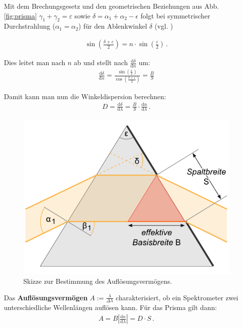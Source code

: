 \documentclass[12pt,a4paper,titlepage,headinclude,bibtotoc]{scrartcl}
\newcommand{\dif}{\ensuremath{\mathrm{d}}}
\begin{document}
Mit dem Brechungsgesetz  und den geometrischen Beziehungen aus Abb.\ref{fig:prisma} $\gamma_1+\gamma_2=\varepsilon$ sowie $\delta=\alpha_1+\alpha_2-\epsilon$ folgt bei symmetrischer Durchstrahlung ($\alpha_1=\alpha_2$) für den Ablenkwinkel $\delta$ (vgl. \cite[S.187f.]{hecht})

\begin{align}
	\sin\left(\frac{\delta+\varepsilon}{2}\right)=n\cdot\sin\left(\frac{\varepsilon}{2}\right)\,.
\end{align}

Dies leitet man nach $n$ ab und stellt nach $\frac{\dif \delta}{\dif n}$ um:
\begin{align}
	\frac{\dif \delta}{\dif n}=\frac{\sin\left(\frac{\varepsilon}{2}\right)}{\cos\left(\frac{\delta+\varepsilon}{2}\right)}=\frac{B}{S}
\end{align}

Damit kann man nun die Winkeldispersion berechnen:
\begin{align}
	D=\frac{\dif \delta}{\dif \lambda}=\frac{B}{S}\cdot\frac{\dif n}{\dif \lambda}\,.
	\label{eq:winkeldispersion}
\end{align}

\begin{figure}[!h]
	\centering
	\includegraphics[scale=0.6]{Prisma2.png}
	\caption{Skizze zur Bestimmung des Auflösungsvermögens. \cite[Datum: 28.12.2014]{LP19}}
	\label{fig:prisma2}
\end{figure}

Das \textbf{Auflösungsvermögen} $A:=\frac{\lambda}{\Delta\lambda}$ charakterisiert, ob ein Spektrometer zwei unterschiedliche Wellenlängen auflösen kann.
Für das Prisma gilt dann:
\begin{align}
	A=B\left|\frac{\dif n}{\dif \lambda}\right|=D\cdot S\,.
	\label{eq:aufloesungP}
\end{align}
\end{document}
